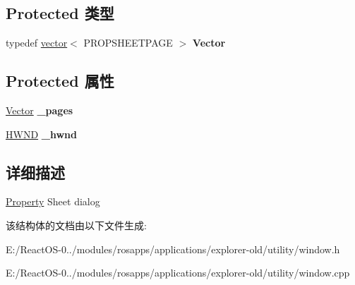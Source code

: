 \subsection*{Protected 类型}
\begin{DoxyCompactItemize}
\item 
\mbox{\label{struct_property_sheet_dialog_a607fb27186a6094708130c48a2e50410}} 
typedef \hyperlink{structvector}{vector}$<$ P\+R\+O\+P\+S\+H\+E\+E\+T\+P\+A\+GE $>$ {\bfseries Vector}
\end{DoxyCompactItemize}
\subsection*{Protected 属性}
\begin{DoxyCompactItemize}
\item 
\mbox{\label{struct_property_sheet_dialog_a362abdd8d2889ddb62b9ce7d2c3a10bb}} 
\hyperlink{structvector}{Vector} {\bfseries \+\_\+pages}
\item 
\mbox{\label{struct_property_sheet_dialog_a6de8dea185571e2de51c37fb95277914}} 
\hyperlink{interfacevoid}{H\+W\+ND} {\bfseries \+\_\+hwnd}
\end{DoxyCompactItemize}


\subsection{详细描述}
\hyperlink{struct_property}{Property} Sheet dialog 

该结构体的文档由以下文件生成\+:\begin{DoxyCompactItemize}
\item 
E\+:/\+React\+O\+S-\/0../modules/rosapps/applications/explorer-\/old/utility/window.\+h\item 
E\+:/\+React\+O\+S-\/0../modules/rosapps/applications/explorer-\/old/utility/window.\+cpp\end{DoxyCompactItemize}
